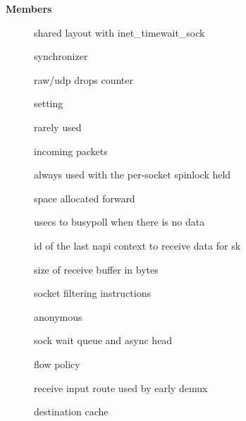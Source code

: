 \documentclass[a4paper,8pt,english]{sphinxmanual}
\begin{document}
\textbf{Members}
\begin{description}
\item[{}] \leavevmode
shared layout with inet\_timewait\_sock

\item[{}] \leavevmode
synchronizer

\item[{}] \leavevmode
raw/udp drops counter

\item[{}] \leavevmode
{} setting

\item[{}] \leavevmode
rarely used

\item[{}] \leavevmode
incoming packets

\item[{}] \leavevmode
always used with the per-socket spinlock held

\item[{}] \leavevmode
space allocated forward

\item[{}] \leavevmode
usecs to busypoll when there is no data

\item[{}] \leavevmode
id of the last napi context to receive data for sk

\item[{}] \leavevmode
size of receive buffer in bytes

\item[{}] \leavevmode
socket filtering instructions

\item[{}] \leavevmode
anonymous

\item[{}] \leavevmode
sock wait queue and async head

\item[{}] \leavevmode
flow policy

\item[{}] \leavevmode
receive input route used by early demux

\item[{}] \leavevmode
destination cache


\end{description}
\end{document}
